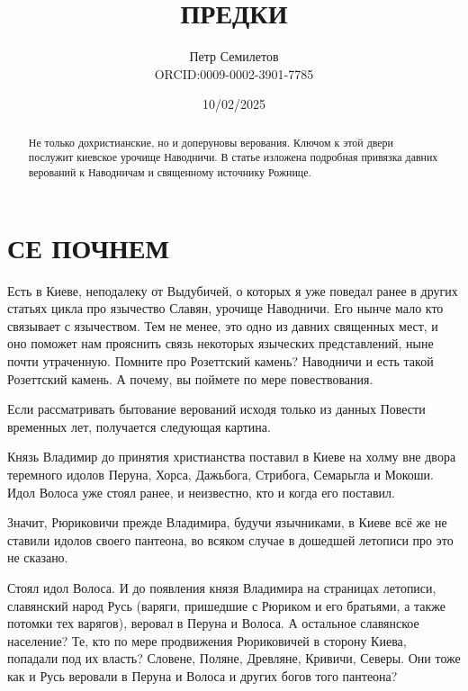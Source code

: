\documentclass[a5paper,11pt,openany]{article}
\title{ПРЕДКИ\\
\textsmaller[2]{редакция 1.0}}
\author{Петр Семилетов\\ORCID:0009-0002-3901-7785 \orcidlink{0009-0002-3901-7785}}
\date{10/02/2025}
\begin{document}
\maketitle

\pagestyle{empty}


\newpage

\pagestyle{plain}



%
%
%

\begin{abstract}
Не только дохристианские, но и доперуновы верования. Ключом к этой двери послужит киевское урочище Наводничи. В статье изложена подробная привязка давних верований к Наводничам и священному источнику Рожнице.
\end{abstract}


\section{СЕ ПОЧНЕМ}

   Есть в Киеве, неподалеку от Выдубичей, о которых я уже поведал ранее в других статьях цикла про язычество Славян, урочище Наводничи. Его нынче мало кто связывает с язычеством. Тем не менее, это одно из давних священных мест, и оно поможет нам прояснить связь некоторых языческих представлений, ныне почти утраченную. Помните про Розеттский камень? Наводничи и есть такой Розеттский камень. А почему, вы поймете по мере повествования. 

   Если рассматривать бытование верований исходя только из данных Повести временных лет, получается следующая картина.

   Князь Владимир до принятия христианства поставил в Киеве на холму вне двора теремного идолов Перуна, Хорса, Дажьбога, Стрибога, Семарьгла и Мокоши. Идол Волоса уже стоял ранее, и неизвестно, кто и когда его поставил. 

   Значит, Рюриковичи прежде Владимира, будучи язычниками, в Киеве всё же не ставили идолов своего пантеона, во всяком случае в дошедшей летописи про это не сказано. 

Стоял идол Волоса. И до появления князя Владимира на страницах летописи, славянский народ Русь (варяги, пришедшие с Рюриком и его братьями, а также потомки тех варягов), веровал в Перуна и Волоса. А остальное славянское население? Те, кто по мере продвижения Рюриковичей в сторону Киева, попадали под их власть? Словене, Поляне, Древляне, Кривичи, Северы. Они тоже как и Русь веровали в Перуна и Волоса и других богов того пантеона?
\end{document}

